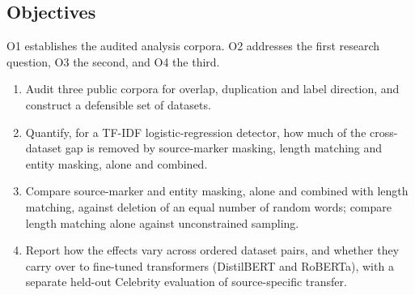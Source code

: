 \subsection{Objectives}
O1 establishes the audited analysis corpora. O2 addresses the first research question, O3 the second, and O4 the third.
\begin{enumerate}
\item[O1] Audit three public corpora for overlap, duplication and label direction, and construct a defensible set of datasets.
\item[O2] Quantify, for a TF-IDF logistic-regression detector, how much of the cross-dataset gap is removed by source-marker masking, length matching and entity masking, alone and combined.
\item[O3] Compare source-marker and entity masking, alone and combined with length matching, against deletion of an equal number of random words; compare length matching alone against unconstrained sampling.
\item[O4] Report how the effects vary across ordered dataset pairs, and whether they carry over to fine-tuned transformers (DistilBERT and RoBERTa), with a separate held-out Celebrity evaluation of source-specific transfer.
\end{enumerate}



